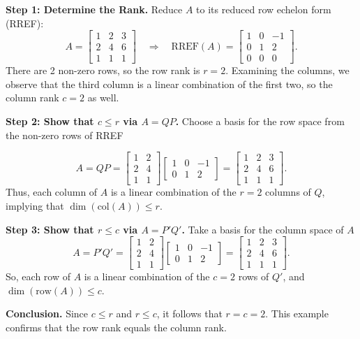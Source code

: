 \documentclass[a4paper, 9pt]{extarticle}
\begin{document}
\begin{examplebox}{}{}
  \noindent\textbf{Step 1: Determine the Rank.} Reduce $A$ to its reduced row echelon form (RREF):
  $$
    A = \begin{bmatrix}
      1 & 2 & 3 \\
      2 & 4 & 6 \\
      1 & 1 & 1
    \end{bmatrix}
    \quad\Longrightarrow\quad
    \text{RREF}(A) = \begin{bmatrix}
      1 & 0 & -1 \\
      0 & 1 & 2  \\
      0 & 0 & 0
    \end{bmatrix}.
  $$
  There are 2 non-zero rows, so the row rank is $r = 2$. Examining the columns, we observe that the third column is a linear combination of the first two, so the column rank $c = 2$ as well.

  \vspace{2ex}
  \noindent\textbf{Step 2: Show that $c \leq r$ via $A = QP$.} Choose a basis for the row space from the non-zero rows of RREF

  $$
    A = QP = \begin{bmatrix}
      1 & 2 \\
      2 & 4 \\
      1 & 1
    \end{bmatrix}
    \begin{bmatrix}
      1 & 0 & -1 \\
      0 & 1 & 2
    \end{bmatrix} = \begin{bmatrix}
      1 & 2 & 3 \\
      2 & 4 & 6 \\
      1 & 1 & 1
    \end{bmatrix}.
  $$
  Thus, each column of $A$ is a linear combination of the $r = 2$ columns of $Q$, implying that $\dim(\text{col}(A)) \leq r$.

  \vspace{2ex}
  \noindent\textbf{Step 3: Show that $r \leq c$ via $A = P'Q'$.} Take a basis for the column space of $A$
  $$
    A = P'Q' = \begin{bmatrix}
      1 & 2 \\
      2 & 4 \\
      1 & 1
    \end{bmatrix}
    \begin{bmatrix}
      1 & 0 & -1 \\
      0 & 1 & 2
    \end{bmatrix} = \begin{bmatrix}
      1 & 2 & 3 \\
      2 & 4 & 6 \\
      1 & 1 & 1
    \end{bmatrix}.
  $$
  So, each row of $A$ is a linear combination of the $c = 2$ rows of $Q'$, and $\dim(\text{row}(A)) \leq c$.

  \vspace{2ex}
  \noindent\textbf{Conclusion.} Since $c \leq r$ and $r \leq c$, it follows that $r = c = 2$. This example confirms that the row rank equals the column rank.
\end{examplebox}
\end{document}
